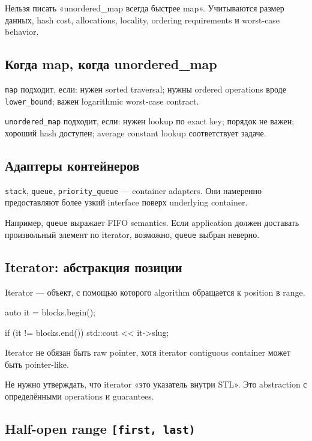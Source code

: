 \begin{warningbox}
Нельзя писать «unordered\_map всегда быстрее map». Учитываются размер данных,
hash cost, allocations, locality, ordering requirements и worst-case behavior.
\end{warningbox}

\subsection{Когда map, когда unordered\_map}

\texttt{map} подходит, если:
нужен sorted traversal; нужны ordered operations вроде \texttt{lower\_bound}; важен logarithmic worst-case contract.

\texttt{unordered\_map} подходит, если:
нужен lookup по exact key; порядок не важен; хороший hash доступен; average constant lookup соответствует задаче.

\subsection{Адаптеры контейнеров}

\texttt{stack}, \texttt{queue}, \texttt{priority\_queue} --- container adapters.
Они намеренно предоставляют более узкий interface поверх underlying container.

Например, \texttt{queue} выражает FIFO semantics. Если application должен
доставать произвольный элемент по iterator, возможно, \texttt{queue} выбран
неверно.

\subsection{Iterator: абстракция позиции}

Iterator --- объект, с помощью которого algorithm обращается к position в
range.

\begin{cppcode}
auto it = blocks.begin();

if (it != blocks.end()) {
    std::cout << it->slug;
}
\end{cppcode}

Iterator не обязан быть raw pointer, хотя iterator contiguous container может
быть pointer-like.

Не нужно утверждать, что iterator «это указатель внутри STL». Это abstraction
с определёнными operations и guarantees.

\subsection{Half-open range \texttt{[first, last)}}

